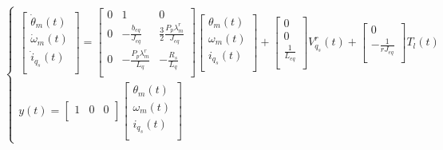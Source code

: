 \documentclass{article}
\begin{document}
\begin{enumerate}[label=\roman*.]
    \begin{equation}
        \begin{cases}
            \begin{bmatrix}
                \dot{\theta}_{m}(t)\\
                \dot{\omega}_{m}(t)\\
                \dot{i}_{q_{s}}(t)\\
            \end{bmatrix} =
            \begin{bmatrix}
                0 & 1 & 0\\
                0 & -\frac{b_{eq}}{J_{eq}} & \frac{3}{2}\frac{P_{p}\lambda_{m}^r}{J_{eq}}\\
                0 & -\frac{P_{p}\lambda_{m}^r}{L_{q}} & -\frac{R_{s}}{L_{q}}\\
            \end{bmatrix}
            \begin{bmatrix}
                {\theta}_{m}(t)\\
                {\omega}_{m}(t)\\
                {i}_{q_{s}}(t)\\
            \end{bmatrix} +
            \begin{bmatrix}
                0\\
                0\\
                \frac{1}{L_{eq}}\\
            \end{bmatrix} V_{q_{s}}^r(t) +
            \begin{bmatrix}
                0\\
                -\frac{1}{rJ_{eq}}\\
            \end{bmatrix} T_{l}(t)\\
            y(t) =
            \begin{bmatrix}
                1 & 0 & 0\\
            \end{bmatrix}
            \begin{bmatrix}
                {\theta}_{m}(t)\\
                {\omega}_{m}(t)\\
                {i}_{q_{s}}(t)\\
            \end{bmatrix}
        \end{cases}
    \end{equation}
        

\end{enumerate}
\end{document}
